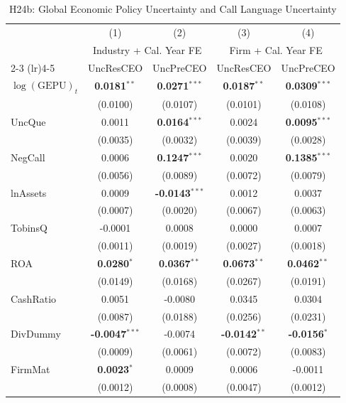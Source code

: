 \begin{landscape}
\begin{table}[H]
\setlength{\tabcolsep}{3pt}
\renewcommand{\arraystretch}{0.85}
\centering
\caption{H24b: Global Economic Policy Uncertainty and Call Language Uncertainty}
\label{tab:h24b_global_epu}
\scriptsize
\begin{tabular}{lcccc}
\toprule
 & (1) & (2) & (3) & (4) \\
 & \multicolumn{2}{c}{Industry + Cal. Year FE} & \multicolumn{2}{c}{Firm + Cal. Year FE} \\
\cmidrule(lr){2-3} \cmidrule(lr){4-5}
 & UncResCEO & UncPreCEO & UncResCEO & UncPreCEO \\
\midrule
$\log(\text{GEPU})_{t}$ & \textbf{0.0181}$^{**}$ & \textbf{0.0271}$^{***}$ & \textbf{0.0187}$^{**}$ & \textbf{0.0309}$^{***}$ \\
 & (0.0100) & (0.0107) & (0.0101) & (0.0108) \\
\midrule
UncQue & 0.0011 & \textbf{0.0164}$^{***}$ & 0.0024 & \textbf{0.0095}$^{***}$ \\
 & (0.0035) & (0.0032) & (0.0039) & (0.0028) \\
NegCall & 0.0006 & \textbf{0.1247}$^{***}$ & 0.0020 & \textbf{0.1385}$^{***}$ \\
 & (0.0056) & (0.0089) & (0.0072) & (0.0079) \\
lnAssets & 0.0009 & \textbf{-0.0143}$^{***}$ & 0.0012 & 0.0037 \\
 & (0.0007) & (0.0020) & (0.0067) & (0.0063) \\
TobinsQ & -0.0001 & 0.0008 & 0.0000 & 0.0007 \\
 & (0.0011) & (0.0019) & (0.0027) & (0.0018) \\
ROA & \textbf{0.0280}$^{*}$ & \textbf{0.0367}$^{**}$ & \textbf{0.0673}$^{**}$ & \textbf{0.0462}$^{**}$ \\
 & (0.0149) & (0.0168) & (0.0267) & (0.0191) \\
CashRatio & 0.0051 & -0.0080 & 0.0345 & 0.0304 \\
 & (0.0087) & (0.0188) & (0.0256) & (0.0231) \\
DivDummy & \textbf{-0.0047}$^{***}$ & -0.0074 & \textbf{-0.0142}$^{**}$ & \textbf{-0.0156}$^{*}$ \\
 & (0.0009) & (0.0061) & (0.0072) & (0.0083) \\
FirmMat & \textbf{0.0023}$^{*}$ & 0.0009 & 0.0006 & -0.0011 \\
 & (0.0012) & (0.0008) & (0.0047) & (0.0012) \\

\end{tabular}
\end{table}
\end{landscape}
